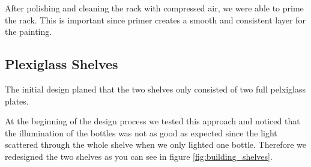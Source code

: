 \documentclass{acm_proc_article-sp}
\begin{document}
After polishing and cleaning the rack with compressed air, we were able to prime the rack. This is important since primer creates a smooth and consistent layer for the painting.


\subsection{Plexiglass Shelves}
The initial design planed that the two shelves only consisted of two full pelxiglass plates.

\begin{minipage}{\linewidth}%
\label{fig:building_shelves}%
\end{minipage}

At the beginning of the design process we tested this approach and noticed that the illumination of the bottles was not as good as expected since the light scattered through the whole shelve when we only lighted one bottle. Therefore we redesigned the two shelves as you can see in figure \ref{fig:building_shelves}. 

\begin{minipage}{\linewidth}%
\label{fig:illuminated_shelves}%
\end{minipage}
\end{document}
